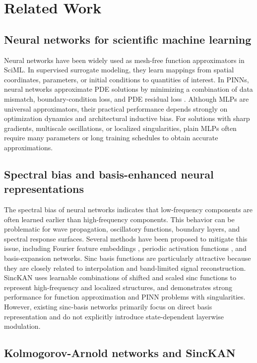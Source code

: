 \documentclass[preprint,12pt]{elsarticle}
\begin{document}
\section{Related Work}

\subsection{Neural networks for scientific machine learning}

Neural networks have been widely used as mesh-free function approximators in SciML. In supervised surrogate modeling, they learn mappings from spatial coordinates, parameters, or initial conditions to quantities of interest. In PINNs, neural networks approximate PDE solutions by minimizing a combination of data mismatch, boundary-condition loss, and PDE residual loss \cite{raissi2019pinn}. Although MLPs are universal approximators, their practical performance depends strongly on optimization dynamics and architectural inductive bias. For solutions with sharp gradients, multiscale oscillations, or localized singularities, plain MLPs often require many parameters or long training schedules to obtain accurate approximations.

\subsection{Spectral bias and basis-enhanced neural representations}

The spectral bias of neural networks indicates that low-frequency components are often learned earlier than high-frequency components. This behavior can be problematic for wave propagation, oscillatory functions, boundary layers, and spectral response surfaces. Several methods have been proposed to mitigate this issue, including Fourier feature embeddings \cite{tancik2020fourier}, periodic activation functions \cite{sitzmann2020siren}, and basis-expansion networks. Sinc basis functions are particularly attractive because they are closely related to interpolation and band-limited signal reconstruction. SincKAN \cite{yu2026sinckan} uses learnable combinations of shifted and scaled sinc functions to represent high-frequency and localized structures, and demonstrates strong performance for function approximation and PINN problems with singularities. However, existing sinc-basis networks primarily focus on direct basis representation and do not explicitly introduce state-dependent layerwise modulation.

\subsection{Kolmogorov-Arnold networks and SincKAN}
\end{document}
